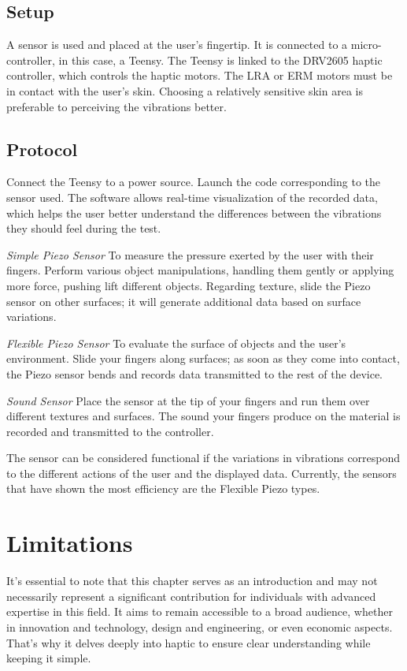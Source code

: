 \subsection{Setup}
A sensor is used and placed at the user's fingertip. It is connected to a micro-controller, in this case, a Teensy. The Teensy is linked to the DRV2605 haptic controller, which controls the haptic motors. The LRA or ERM motors must be in contact with the user's skin. Choosing a relatively sensitive skin area is preferable to perceiving the vibrations better.

\subsection{Protocol}
Connect the Teensy to a power source. Launch the code corresponding to the sensor used. The software allows real-time visualization of the recorded data, which helps the user better understand the differences between the vibrations they should feel during the test.

\textit{Simple Piezo Sensor}
To measure the pressure exerted by the user with their fingers. Perform various object manipulations, handling them gently or applying more force, pushing lift different objects. Regarding texture, slide the Piezo sensor on other surfaces; it will generate additional data based on surface variations.

\textit{Flexible Piezo Sensor}
To evaluate the surface of objects and the user's environment. Slide your fingers along surfaces; as soon as they come into contact, the Piezo sensor bends and records data transmitted to the rest of the device.

\textit{Sound Sensor}
Place the sensor at the tip of your fingers and run them over different textures and surfaces. The sound your fingers produce on the material is recorded and transmitted to the controller.

The sensor can be considered functional if the variations in vibrations correspond to the different actions of the user and the displayed data. Currently, the sensors that have shown the most efficiency are the Flexible Piezo types.

\section{Limitations}
It’s essential to note that this chapter serves as an introduction and may not necessarily represent a significant contribution for individuals with advanced expertise in this field. It aims to remain accessible to a broad audience, whether in innovation and technology, design and engineering, or even economic aspects. That's why it delves deeply into haptic to ensure clear understanding while keeping it simple.

